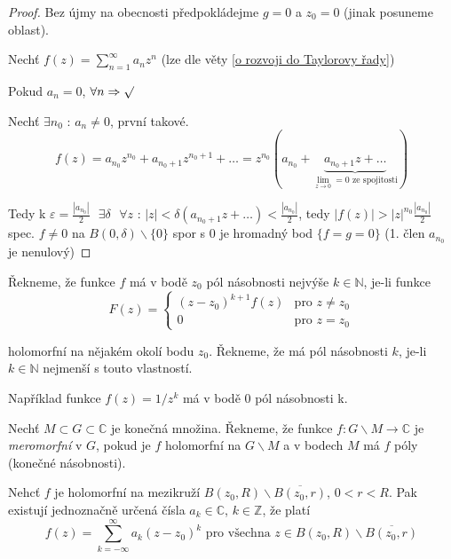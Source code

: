 \begin{proof}
Bez újmy na obecnosti předpokládejme $g=0$ a $z_0=0$ (jinak posuneme oblast).

Nechť $f(z) = \sum_{n=1}^\infty a_n z^n$ (lze dle věty \ref{o rozvoji do Taylorovy řady})

Pokud $a_n = 0$, $\forall n \Rightarrow \surd$

Nechť $\exists n_0 \textrm{ : } a_n \neq 0$, první takové. 
$$f(z) = a_{n_0} z^{n_0} + a_{n_0 + 1} z^{n_0 + 1} + \ldots = z^{n_0} \left( a_{n_0} + \underbrace{a_{n_0 + 1} z + \ldots}_{\lim_{z \to 0} = 0 \textrm{ ze spojitosti}} \right)$$

Tedy k $\varepsilon = \frac{|a_{n_0}|}{2} \textrm{ } \exists \delta \textrm{ } \forall z \textrm{ : } |z| < \delta (a_{n_0 + 1} z + \ldots) < \frac{|a_{n_0}|}{2}$, tedy $|f(z)| > |z|^{n_0} \frac{|a_{n_0}|}{2}$ spec. $f \neq 0$ na $B(0, \delta) \backslash \{ 0 \}$ spor s $0$ je hromadný bod $\{ f = g = 0 \}$ (1. člen $a_{n_0}$ je nenulový)
\end{proof}


\begin{definice}
Řekneme, že funkce $f$ má v bodě $z_0$ pól násobnosti nejvýše $k \in \mathbb{N}$, je-li funkce 
\begin{equation}
F(z) = \left\{ \begin{array}{ll}
 (z-z_0)^{k+1}f(z) & \textrm{pro $z \neq z_0$} \nonumber\\
 0 & \textrm{pro $z=z_0$}
  \end{array} \right.
\end{equation}

holomorfní na nějakém okolí bodu $z_0$. Řekneme, že má pól násobnosti $k$, je-li $k \in \mathbb{N}$ nejmenší s touto vlastností.
\end{definice}

Například funkce $f(z) = 1 / z^k$ má v bodě 0 pól násobnosti k.

\begin{definice}
Nechť $M \subset G \subset \mathbb{C}$ je konečná množina. Řekneme, že funkce $f : G \backslash M \rightarrow \mathbb{C}$ je \emph{meromorfní} v $G$, pokud je $f$ holomorfní na $G \backslash M$ a v bodech $M$ má $f$ póly (konečné násobnosti).
\end{definice}

\begin{vetat}
Nehcť $f$ je holomorfní na mezikruží $B(z_0, R) \backslash \overline{B(z_0, r)}$, $0 < r < R$. Pak existují jednoznačně určená čísla $a_k \in \mathbb{C}$, $k \in \mathbb{Z}$, že platí 
$$f(z) = \sum_{k= - \infty}^\infty a_k (z-z_0)^k \textrm{ pro všechna } z \in B(z_0, R) \backslash \overline{B(z_0, r)}$$
\end{vetat}